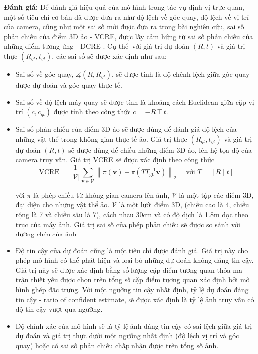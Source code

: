 \textbf{Đánh giá:} Để đánh giá hiệu quả của mô hình trong tác vụ định vị trực quan, một số tiêu chí cơ bản đã được đưa ra như độ lệch về góc quay, độ lệch về vị trí của camera, cũng như một sai số mới được đưa ra trong bài nghiên cứu, sai số phản chiếu của điểm 3D ảo - VCRE, được lấy cảm hứng từ sai số phản chiếu của những điểm tương ứng - DCRE \cite{wald2020beyond}. Cụ thể, với giá trị dự đoán $(R,t)$ và giá trị thực $(R_{gt},t_{gt})$, các sai số sẽ được xác định như sau:
\begin{itemize}
  \item Sai số về góc quay, $\measuredangle(R,R_{gt})$, sẽ được tính là độ chênh lệch giữa góc quay được dự đoán và góc quay thực tế.
  \item Sai số về độ lệch máy quay sẽ được tính là khoảng cách Euclidean giữa cặp vị trí $(c,c_{gt})$ được tính theo công thức $c=-R \intercal t$.
  \item Sai số phản chiếu của điểm 3D ảo sẽ được dùng để đánh giá độ lệch của những vật thể trong không gian thực tế ảo. Giá trị thực $(R_{gt},t_{gt})$ và giá trị dự đoán $(R,t)$ sẽ được dùng để chiếu những điểm 3D ảo, lên hệ tọa độ của camera truy vấn. Giá trị VCRE sẽ được xác định theo công thức
        $$
          \operatorname{VCRE}=\frac{1}{|\mathcal{V}|} \sum_{\mathbf{v} \in \mathcal{V}}\left\|\pi(\mathbf{v})-\pi\left(T T_{\mathrm{gt}}^{-1} \mathbf{v}\right)\right\|_2 \quad \text { với } T=[R \mid t]
        $$

        với $\pi$ là phép chiếu từ không gian camera lên ảnh, $\mathcal{V}$ là một tập các điểm 3D, đại diện cho những vật thể ảo. $\mathcal{V}$ là một lưới điểm 3D, (chiều cao là 4, chiều rộng là 7 và chiều sâu là 7), cách nhau 30cm và có độ dịch là 1.8m dọc theo trục của máy ảnh. Giá trị sai số của phép phản chiếu sẽ được so sánh với đường chéo của ảnh.
  \item Độ tin cậy của dự đoán cũng là một tiêu chí được đánh giá. Giá trị này cho phép mô hình có thể phát hiện và loại bỏ những dự đoán không đáng tin cậy. Giá trị này sẽ được xác định bằng số lượng cặp điểm tương quan thỏa ma trận thiết yếu được chọn trên tổng số cặp điểm tương quan xác định bởi mô hình ghép đặc trưng. Với một ngưỡng tin cậy nhất định, tỷ lệ dự đoán đáng tin cậy - ratio of confident estimate, sẽ được xác định là tỷ lệ ảnh truy vấn có độ tin cậy vượt qua ngưỡng.
  \item Độ chính xác của mô hình sẽ là tỷ lệ ảnh đáng tin cậy có sai lệch giữa giá trị dự đoán và giá trị thực dưới một ngưỡng nhất định (độ lệch vị trí và góc quay) hoặc có sai số phản chiếu chấp nhận được trên tổng số ảnh.
\end{itemize}

